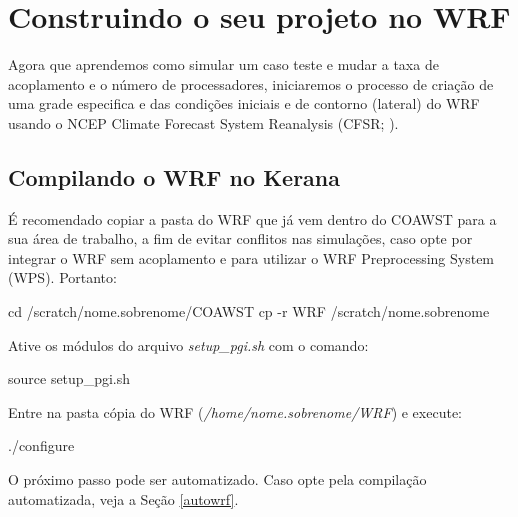 \chapter{Construindo o seu projeto no WRF}

\noindent Agora que aprendemos como simular um caso teste e mudar a taxa de acoplamento e o número de processadores, iniciaremos o processo de criação de uma grade especifica e das condições iniciais e de contorno (lateral) do WRF usando o NCEP Climate Forecast System Reanalysis (CFSR; \cite{Saha2006}).
\bigskip

\section{Compilando o WRF no Kerana}
\bigskip
\noindent É recomendado copiar a pasta do WRF que já vem dentro do COAWST para a sua área de trabalho, a fim de evitar conflitos nas simulações, caso opte por integrar o WRF sem acoplamento e para utilizar o WRF Preprocessing System (WPS). Portanto:
\bigskip

\begin{bashcode}
cd /scratch/nome.sobrenome/COAWST
cp -r WRF /scratch/nome.sobrenome
\end{bashcode}
\bigskip

\noindent Ative os módulos do arquivo \textit{setup\_pgi.sh} com o comando:
\bigskip
\begin{bashcode}
source setup_pgi.sh
\end{bashcode}
\bigskip

\noindent Entre na pasta cópia do WRF (\textit{/home/nome.sobrenome/WRF}) e execute:
\bigskip

\begin{bashcode}
./configure
\end{bashcode}
\bigskip

\begin{tcolorbox}[enhanced,
  grow to left by=0cm,%
  grow to right by=0cm,%
  enlarge top by=0cm,%
  enlarge bottom by=0cm,%
  tcbox raise base,
  boxrule=1.0pt,
  left=18mm,
  colframe=red!50!black,coltext=red!25!black,colback=red!10!white,
  overlay={\begin{tcbclipinterior}\fill[red!75!blue!50!white] (frame.south west)
    rectangle node[text=white,font=\sffamily\bfseries\footnotesize,rotate=0] {ATENÇÃO} ([xshift=18mm]frame.north west);\end{tcbclipinterior}}]
O próximo passo pode ser automatizado. Caso opte pela compilação automatizada, veja a Seção \textcolor{bleu_cite}{\ref{autowrf}}.
\end{tcolorbox}
\bigskip

